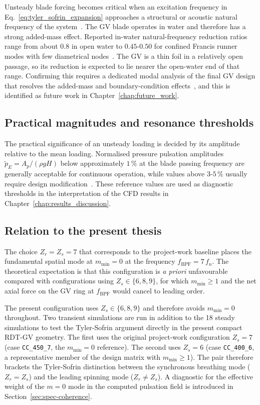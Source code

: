 Unsteady blade forcing becomes critical when an excitation frequency in
Eq.~\eqref{eq:tyler_sofrin_expansion} approaches a structural or acoustic
natural frequency of the system~\cite{Tanaka2011}. The GV
blade operates in water and therefore has a strong added-mass effect.
Reported in-water natural-frequency reduction ratios range from about
$0.8$ in open water to $0.45$-$0.50$ for confined Francis runner modes
with few diametrical nodes~\cite{Tanaka2011}. The GV is a thin foil in a
relatively open passage, so its reduction is expected to lie nearer the
open-water end of that range. Confirming this requires a dedicated modal
analysis of the final GV design that resolves the added-mass and
boundary-condition effects~\cite{Valentin2015}, and this is identified as
future work in Chapter~\ref{chap:future_work}.
 
\subsection{Practical magnitudes and resonance thresholds}
\label{sec:rsi-magnitudes}

The practical significance of an unsteady loading is decided by its amplitude relative to the mean loading. Normalised pressure pulsation amplitudes $\tilde{p}_{E} = A_p / (\rho g H)$ below approximately $1\,\%$ at the blade passing frequency are generally acceptable for continuous operation, while values above $3$-$5\,\%$ usually require design modification~\cite{Brekke2001, Egusquiza2006}. These reference values are used as diagnostic thresholds in the interpretation of the CFD results in Chapter~\ref{chap:results_discussion}.
 
\subsection{Relation to the present thesis}
\label{sec:rsi-thesis}
 
The choice $Z_r = Z_s = 7$ that corresponds to the project-work baseline places the fundamental spatial mode at $m_{\min} = 0$ at the frequency $f_{\mathrm{BPF}} = 7\,f_n$. The theoretical expectation is that this configuration is \emph{a priori} unfavourable compared with configurations using $Z_s \in \{6,8,9\}$, for which $m_{\min} \geq 1$ and the net axial force on the GV ring at $f_{\mathrm{BPF}}$ would cancel to leading order.
 
The present configuration uses $Z_s \in \{6,8,9\}$ and therefore avoids $m_{\min}=0$ throughout. Two transient simulations are run in addition to the 18 steady simulations to test the Tyler-Sofrin argument directly in the present compact RDT-GV geometry. The first uses the original project-work configuration $Z_s = 7$ (case \texttt{CC\_450\_7}, the $m_{\min}=0$ reference). The second uses $Z_s = 6$ (case \texttt{CC\_400\_6}, a representative member of the design matrix with $m_{\min} \geq 1$). The pair therefore brackets the Tyler-Sofrin distinction between the synchronous breathing mode ($Z_r=Z_s$) and the leading spinning mode ($Z_r\neq Z_s$). A diagnostic for the effective weight of the $m=0$ mode in the computed pulsation field is introduced in Section~\ref{sec:spec-coherence}.

